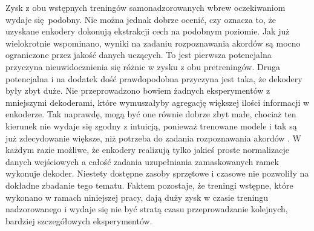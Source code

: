 Zysk z obu wstępnych treningów samonadzorowanych wbrew oczekiwaniom wydaje się podobny. Nie można jednak dobrze ocenić, czy oznacza to, że uzyskane enkodery dokonują ekstrakcji cech na podobnym poziomie. Jak już wielokrotnie wspominano, wyniki na zadaniu rozpoznawania akordów są mocno ograniczone przez jakość danych uczących. To jest pierwsza potencjalna przyczyna nieuwidocznienia się różnic w zysku z obu pretreningów. Druga potencjalna i na dodatek dość prawdopodobna przyczyna jest taka, że dekodery były zbyt duże. Nie przeprowadzono bowiem żadnych eksperymentów z mniejszymi dekoderami, które wymuszałyby agregację większej ilości informacji w enkoderze. Tak naprawdę, mogą być one równie dobrze zbyt małe, chociaż ten kierunek nie wydaje się zgodny z intuicją, ponieważ trenowane modele i tak są już zdecydowanie większe, niż potrzeba do zadania rozpoznawania akordów \cite{ohanlon_fifthnet_2021}. W każdym razie możliwe, że enkodery realizują tylko jakieś proste normalizacje danych wejściowych a całość zadania uzupełniania zamaskowanych ramek wykonuje dekoder. Niestety dostępne zasoby sprzętowe i czasowe nie pozwoliły na dokładne zbadanie tego tematu. Faktem pozostaje, że treningi wstępne, które wykonano w ramach niniejszej pracy, dają duży zysk w czasie treningu nadzorowanego i wydaje się nie być stratą czasu przeprowadzanie kolejnych, bardziej szczegółowych eksperymentów.

